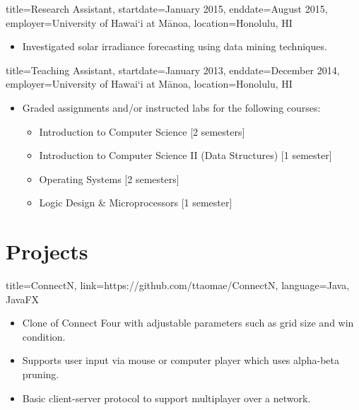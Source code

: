 \documentclass{resume}
\newcommand{\hawaii}{Hawai\lq i}
\newcommand{\uhm}{University of \hawaii{} at M\={a}noa}
\begin{document}
\begin{job}{title=Research Assistant,
            startdate=January 2015,
            enddate=August 2015,
            employer=\uhm,
            location={Honolulu, HI}}
    \begin{itemize}
        \item{Investigated solar irradiance forecasting using data mining techniques.}
    \end{itemize}
\end{job}

\begin{job}{title=Teaching Assistant,
            startdate=January 2013,
            enddate=December 2014,
            employer=\uhm,
            location={Honolulu, HI}}
    \begin{itemize}
        \item{Graded assignments and/or instructed labs for the following courses:}
        \begin{itemize}
            \item{Introduction to Computer Science [2 semesters]}
            \item{Introduction to Computer Science II (Data Structures) [1 semester]}
            \item{Operating Systems [2 semesters]}
            \item{Logic Design \& Microprocessors [1 semester]}
        \end{itemize}
    \end{itemize}
\end{job}

\section*{Projects}
\begin{project}{title=ConnectN,
            link=https://github.com/ttaomae/ConnectN,
            language={Java, JavaFX}}
    \begin{itemize}
        \item{Clone of Connect Four with adjustable parameters such as grid size and win condition.}
        \item{Supports user input via mouse or computer player which uses alpha-beta pruning.}
        \item{Basic client-server protocol to support multiplayer over a network.}
    \end{itemize}
\end{project}
\end{document}
